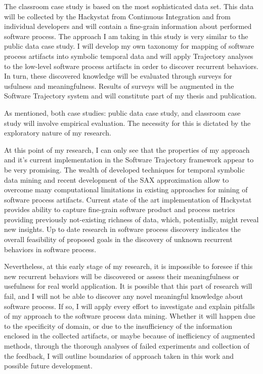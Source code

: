 The classroom case study is based on the most sophisticated data set. This data will be collected by the Hackystat from Continuous Integration and from individual developers and will contain a fine-grain information about performed software process. The approach I am taking in this study is very similar to the public data case study. I will develop my own taxonomy for mapping of software process artifacts into symbolic temporal data and will apply Trajectory analyses to the low-level software process artifacts in order to discover recurrent behaviors. In turn, these discovered knowledge will be evaluated through surveys for usfulness and meaningfulness. Results of surveys will be augmented in the Software Trajectory system and will constitute part of my thesis and publication.

As mentioned, both case studies: public data case study, and classroom case study will involve empirical evaluation. The necessity for this is dictated by the exploratory nature of my research. 

At this point of my research, I can only see that the properties of my approach and it's current implementation in the Software Trajectory framework appear to be very promising. The wealth of developed techniques for temporal symbolic data mining and recent development of the SAX approximation allow to overcome many computational limitations in existing approaches for mining of software process artifacts. Current state of the art implementation of Hackystat provides ability to capture fine-grain software product and process metrics providing previously not-existing richness of data, which, potentially, might reveal new insights. Up to date research in software process discovery indicates the overall feasibility of proposed goals in the discovery of unknown recurrent behaviors in software process. 

Nevertheless, at this early stage of my research, it is impossible to foresee if this new recurrent behaviors will be discovered or assess their meaningfulness or usefulness for real world application. It is possible that this part of research will fail, and I will not be able to discover any novel meaningful knowledge about software process. If so, I will apply every effort to investigate and explain pitfalls of my approach to the software process data mining. Whether it will happen due to the specificity of domain, or due to the insufficiency of the information enclosed in the collected artifacts, or maybe because of inefficiency of augmented methods, through the thorough analyses of failed experiments and collection of the feedback, I will outline boundaries of approach taken in this work and possible future development.
